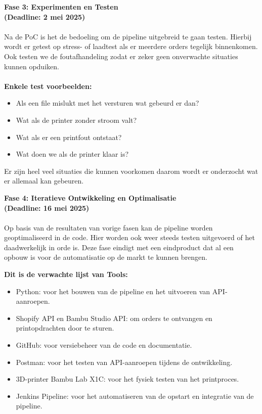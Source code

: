 \textbf{Fase 3: Experimenten en Testen}\\
\textbf{(Deadline: 2 mei 2025)}\\\\
Na de PoC is het de bedoeling om de pipeline uitgebreid te gaan testen. Hierbij wordt er getest op stress- of laadtest als er meerdere orders tegelijk binnenkomen. Ook testen we de foutafhandeling zodat er zeker geen onverwachte situaties kunnen opduiken. \\\\\textbf{Enkele test voorbeelden:}
\begin{itemize}
 \item Als een file mislukt met het versturen wat gebeurd er dan?
 \item Wat als de printer zonder stroom valt?
 \item Wat als er een printfout ontstaat?
 \item Wat doen we als de printer klaar is?
\end{itemize}
Er zijn heel veel situaties die kunnen voorkomen daarom wordt er onderzocht wat er allemaal kan gebeuren.
\vspace{1em}

\textbf{Fase 4: Iteratieve Ontwikkeling en Optimalisatie}\\
\textbf{(Deadline: 16 mei 2025)}\\\\
Op basis van de resultaten van vorige fasen kan de pipeline worden geoptimaliseerd in de code. Hier worden ook weer steeds testen uitgevoerd of het daadwerkelijk in orde is. Deze fase eindigt met een eindproduct dat al een opbouw  is voor de automatisatie op de markt te kunnen brengen.  

\vspace{1em}
\textbf{Dit is de verwachte lijst van Tools:}\\
\begin{itemize}
\item Python: voor het bouwen van de pipeline en het uitvoeren van API-aanroepen.
\item Shopify API en Bambu Studio API: om orders te ontvangen en printopdrachten door te sturen.
\item GitHub: voor versiebeheer van de code en documentatie.
\item Postman: voor het testen van API-aanroepen tijdens de ontwikkeling.
\item 3D-printer Bambu Lab X1C: voor het fysiek testen van het printproces.
\item Jenkins Pipeline: voor het automatiseren van de opstart en integratie van de pipeline.
\end{itemize}

